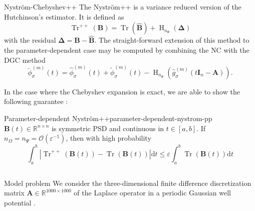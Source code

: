 \documentclass[final, 12pt]{beamer}
\newcommand{\mtx}[1]{\boldsymbol{#1}}
\newcommand{\vct}[1]{\boldsymbol{#1}}
\DeclareMathOperator{\Tr}{Tr}
\DeclareMathOperator{\Hutch}{H}
\begin{document}
\begin{frame}[t]
\begin{columns}[t]
\begin{column}{0.3\paperwidth}
        \begin{block}{Nystr\"om-Chebyshev++}
            The Nystr\"om++ is a variance reduced version
            of the Hutchinson's estimator. It is defined as
            \begin{equation}
                \Tr^{++}(\mtx{B}) = \Tr(\widehat{\mtx{B}}) + \Hutch_{n_{\Psi}}(\mtx{\Delta})
            \end{equation}
            with the residual $\mtx{\Delta} = \mtx{B} - \widehat{\mtx{B}}$.
            The straight-forward extension of this method to the
            parameter-dependent case may be computed by combining the \gls{NC} with the \gls{DGC} method
            \begin{equation}
                \boxed{\breve{\phi}_{\sigma}^{(m)}(t) = \widehat{\phi}_{\sigma}^{(m)}(t) + \widetilde{\phi}_{\sigma}^{(m)}(t) - \Hutch_{n_{\Psi}}(\widehat{g}_{\sigma}^{(m)}(t\mtx{I}_n - \mtx{A})).}
            \end{equation}
        \end{block}
        In the case where the Chebyshev expansion is exact,
        we are able to show the following guarantee \cite{he2023parameter}:
        \begin{thm}{Parameter-dependent Nystr\"om++}{parameter-dependent-nystrom-pp}
            $\mtx{B}(t) \in \mathbb{R}^{n \times n}$ is symmetric \gls{PSD}
            and continuous in $t \in [a, b]$. If $n_{\Omega} = n_{\Psi} = \mathcal{O}\left( \varepsilon^{-1} \right)$,
            then with high probability
            \begin{equation}
                \int_{a}^{b} |\Tr^{++}(\mtx{B}(t)) - \Tr(\mtx{B}(t))| \mathrm{d}t \leq \varepsilon \int_{a}^{b}\Tr(\mtx{B}(t)) \mathrm{d}t
            \end{equation}
        \end{thm}

    \end{column}

\end{columns}


\vspace{5pt}
\begin{columns}[t]

    \begin{column}{0.45\paperwidth}

        \begin{block}{Model problem}
            We consider the three-dimensional finite difference discretization matrix
            $\mtx{A} \in \mathbb{R}^{1000 \times 1000}$ of
            the Laplace operator in a periodic Gaussian well potential \cite{lin2017randomized}.
            

\end{block}
\end{column}
\end{columns}
\end{frame}
\end{document}

